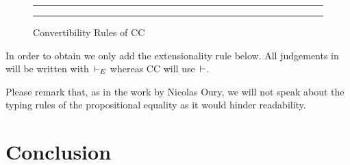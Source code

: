 \documentclass[11pt]{article}
\theoremstyle{plain}
\theoremstyle{remark}
\begin{document}
\begin{figure}[h]
  \hrule \vspace*{2ex}%

  \begin{mathc}
    \qquad
  \end{mathc}

  \begin{mathc}
  \end{mathc}

  \begin{mathc}
  \end{mathc}

  \hrule%

  \caption{Convertibility Rules of CC}
  \label{fig:cc-conv}
\end{figure}

In order to obtain \CCe we only add the extensionality rule below.
All judgements in \CCe will be written with $\,\vdash_E$ whereas CC will use $\,\vdash$.
\begin{mathc}
\end{mathc}

Please remark that, as in the work by Nicolas Oury, we will not speak about the
typing rules of the propositional equality as it would hinder readability.

\section*{Conclusion}
\end{document}
